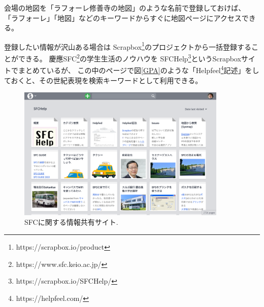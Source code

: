 \documentclass{ipsjprosym}
\begin{document}
会場の地図を「ラフォーレ修善寺の地図」のような名前で登録しておけば、
「ラフォーレ」「地図」などのキーワードからすぐに地図ページにアクセスできる。


登録したい情報が沢山ある場合は
Scrapbox\footnote{
  \textsf{https://scrapbox.io/product}
}のプロジェクトから一括登録することができる。
慶應SFC\footnote{
  \textsf{https://www.sfc.keio.ac.jp/}
}の学生生活のノウハウを
SFCHelp\footnote{
  \textsf{https://scrapbox.io/SFCHelp/}
}というScrapboxサイトでまとめているが、
この中のページで図\ref{GPA}のような「Helpfeel\footnote{
  \textsf{https://helpfeel.com/}
}記述」をしておくと、その世紀表現を検索キーワードとして利用できる。

\begin{figure}[h]
  \includegraphics[width=10cm,bb=0 0 2094 1340]{figures/d3953ee26dadc46b4761014664a1c7a3.png}
  \caption{SFCに関する情報共有サイト.}
  \label{sfchelp}
\end{figure}
\end{document}
